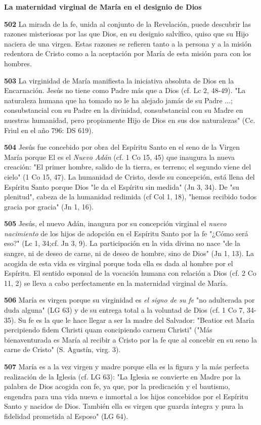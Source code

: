 \documentclass[]{article}
\begin{document}
\textbf{La maternidad virginal de María en el designio de Dios}

\textbf{502} La mirada de la fe, unida al conjunto de la Revelación,
puede descubrir las razones misteriosas por las que Dios, en su designio
salvífico, quiso que su Hijo naciera de una virgen. Estas razones se
refieren tanto a la persona y a la misión redentora de Cristo como a la
aceptación por María de esta misión para con los hombres.

\textbf{503} La virginidad de María manifiesta la iniciativa absoluta de
Dios en la Encarnación. Jesús no tiene como Padre más que a Dios (cf. Lc
2, 48-49). "La naturaleza humana que ha tomado no le ha alejado jamás de
su Padre ...; consubstancial con su Padre en la divinidad,
consubstancial con su Madre en nuestras humanidad, pero propiamente Hijo
de Dios en sus dos naturalezas" (Cc. Friul en el año 796: DS 619).

\textbf{504} Jesús fue concebido por obra del Espíritu Santo en el seno
de la Virgen María porque El es el \emph{Nuevo Adán} (cf. 1 Co 15, 45)
que inaugura la nueva creación: "El primer hombre, salido de la tierra,
es terreno; el segundo viene del cielo" (1 Co 15, 47). La humanidad de
Cristo, desde su concepción, está llena del Espíritu Santo porque Dios
"le da el Espíritu sin medida" (Jn 3, 34). De "su plenitud", cabeza de
la humanidad redimida (cf Col 1, 18), "hemos recibido todos gracia por
gracia" (Jn 1, 16).

\textbf{505} Jesús, el nuevo Adán, inaugura por su concepción virginal
el \emph{nuevo nacimiento} de los hijos de adopción en el Espíritu Santo
por la fe "¿Cómo será eso?" (Lc 1, 34;cf. Jn 3, 9). La participación en
la vida divina no nace "de la sangre, ni de deseo de carne, ni de deseo
de hombre, sino de Dios" (Jn 1, 13). La acogida de esta vida es virginal
porque toda ella es dada al hombre por el Espíritu. El sentido esponsal
de la vocación humana con relación a Dios (cf. 2 Co 11, 2) se lleva a
cabo perfectamente en la maternidad virginal de María.

\textbf{506} María es virgen porque su virginidad es \emph{el signo de
su fe} "no adulterada por duda alguna" (LG 63) y de su entrega total a
la voluntad de Dios (cf. 1 Co 7, 34-35). Su fe es la que le hace llegar
a ser la madre del Salvador: "Beatior est Maria percipiendo fidem
Christi quam concipiendo carnem Christi" ("Más bienaventurada es María
al recibir a Cristo por la fe que al concebir en su seno la carne de
Cristo" (S. Agustín, virg. 3).

\textbf{507} María es a la vez virgen y madre porque ella es la figura y
la más perfecta realización de la Iglesia (cf. LG 63): "La Iglesia se
convierte en Madre por la palabra de Dios acogida con fe, ya que, por la
predicación y el bautismo, engendra para una vida nueva e inmortal a los
hijos concebidos por el Espíritu Santo y nacidos de Dios. También ella
es virgen que guarda íntegra y pura la fidelidad prometida al Esposo"
(LG 64).
\end{document}
